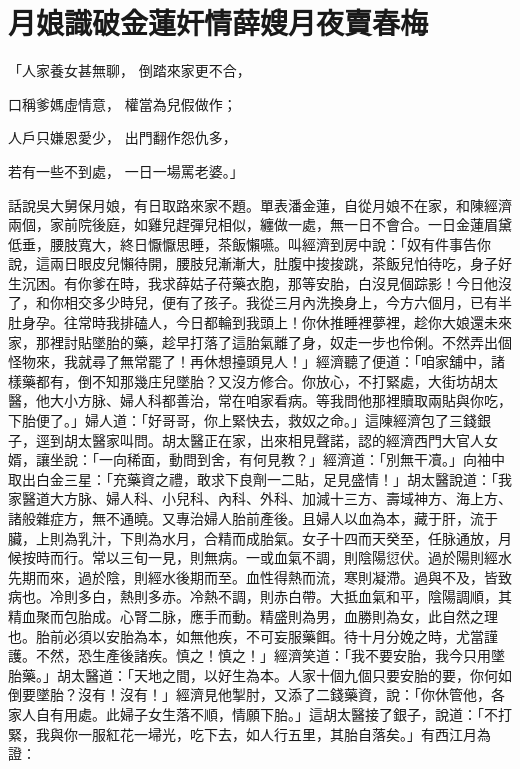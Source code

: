 %

\chapter{月娘識破金蓮奸情\KG 薛嫂月夜賣春梅}

「人家養女甚無聊，  倒踏來家更不合，

口稱爹媽虛情意，  權當為兒假做作；

人戶只嫌恩愛少，  出門翻作怨仇多，

若有一些不到處，  一日一場罵老婆。」

話說吳大舅保月娘，有日取路來家不題。單表潘金蓮，自從月娘不在家，和陳經濟兩個，家前院後庭，如雞兒趕彈兒相似，纏做一處，無一日不會合。一日金蓮眉黛低垂，腰肢寬大，終日懨懨思睡，茶飯懶嚥。叫經濟到房中說：「奴有件事告你說，這兩日眼皮兒懶待開，腰肢兒漸漸大，肚腹中捘捘跳，茶飯兒怕待吃，身子好生沉困。有你爹在時，我求薛姑子苻藥衣胞，那等安胎，白沒見個踪影！今日他沒了，和你相交多少時兒，便有了孩子。我從三月內洗換身上，今方六個月，已有半肚身孕。往常時我排磕人，今日都輪到我頭上！你休推睡裡夢裡，趁你大娘還未來家，那裡討貼墜胎的藥，趁早打落了這胎氣離了身，奴走一步也伶俐。不然弄出個怪物來，我就尋了無常罷了！再休想擡頭見人！」經濟聽了便道：「咱家舖中，諸樣藥都有，倒不知那幾庄兒墜胎？又沒方修合。你放心，不打緊處，大街坊胡太醫，他大小方脉、婦人科都善治，常在咱家看病。等我問他那裡贖取兩貼與你吃，下胎便了。」婦人道：「好哥哥，你上緊快去，救奴之命。」這陳經濟包了三錢銀子，逕到胡太醫家叫問。胡太醫正在家，出來相見聲諾，認的經濟西門大官人女婿，讓坐說：「一向稀面，動問到舍，有何見教？」經濟道：「別無干凟。」向袖中取出白金三星：「充藥資之禮，敢求下良劑一二貼，足見盛情！」胡太醫說道：「我家醫道大方脉、婦人科、小兒科、內科、外科、加減十三方、壽域神方、海上方、諸般雜症方，無不通曉。又專治婦人胎前產後。且婦人以血為本，藏于肝，流于臟，上則為乳汁，下則為水月，合精而成胎氣。女子十四而天癸至，任脉通放，月候按時而行。常以三旬一見，則無病。一或血氣不調，則陰陽愆伏。過於陽則經水先期而來，過於陰，則經水後期而至。血性得熱而流，寒則凝滯。過與不及，皆致病也。冷則多白，熱則多赤。冷熱不調，則赤白帶。大抵血氣和平，陰陽調順，其精血聚而包胎成。心腎二脉，應手而動。精盛則為男，血勝則為女，此自然之理也。胎前必須以安胎為本，如無他疾，不可妄服藥餌。待十月分娩之時，尤當謹護。不然，恐生產後諸疾。慎之！慎之！」經濟笑道：「我不要安胎，我今只用墜胎藥。」胡太醫道：「天地之間，以好生為本。人家十個九個只要安胎的要，你何如倒要墜胎？沒有！沒有！」經濟見他掣肘，又添了二錢藥資，說：「你休管他，各家人自有用處。此婦子女生落不順，情願下胎。」這胡太醫接了銀子，說道：「不打緊，我與你一服紅花一埽光，吃下去，如人行五里，其胎自落矣。」有西江月為證：

